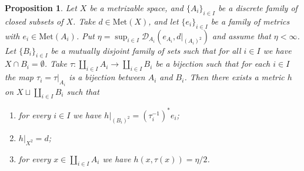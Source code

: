 \documentclass[a4paper, 12pt]{amsart}
\theoremstyle{plain}
\newtheorem{prop}[thm]{Proposition}
\theoremstyle{definition}
\theoremstyle{remark}
\newcommand{\met}[1]{\mathrm{Met}(#1)}
\newcommand{\metdis}{\mathcal{D}}
\begin{document}
\begin{prop}\label{prop:key}
Let 
$X$ 
be a metrizable space, 
and 
$\{A_{i}\}_{i\in I}$ 
be a discrete family of closed subsets of 
$X$. 
Take 
$d\in \met{X}$,  
and let 
$\{e_{i}\}_{i\in I}$ 
be a family of metrics with 
$e_{i} \in \met{A_{i}}$. 
Put  
$\eta=\sup_{i\in I}\metdis_{A_{i}}(e_{A_{i}}, d|_{(A_{i})^2})$
and assume that 
$\eta<\infty$. 
Let 
$\{B_{i}\}_{i\in I}$ 
be a mutually disjoint family of sets 
such that for all 
$i\in I$ 
we have 
$X\cap B_{i}=\emptyset$. 
Take 
$\tau\colon  \coprod_{i\in I}A_{i}\to \coprod_{i\in I}B_{i}$ 
be a bijection such that 
for each 
$i\in I$ 
the map 
$\tau_{i}=\tau|_{A_{i}}$ 
is a bijection between 
$A_{i}$ 
and 
$B_{i}$. 
Then 
there exists a metric 
$h$ 
on 
$X\sqcup\coprod_{i\in I}B_{i}$ 
such that
\begin{enumerate}
	\item for every 
	$i\in I$ 
	we have 
	$h|_{(B_{i})^2}=(\tau_i^{-1})^{*}e_{i}$; 
	\item $h|_{X^2}=d$; 
	\item for every 
	$x\in \coprod_{i\in I}A_{i}$ 
	we have $h(x, \tau(x))= \eta/2$. 
\end{enumerate}
\end{prop}
\end{document}
